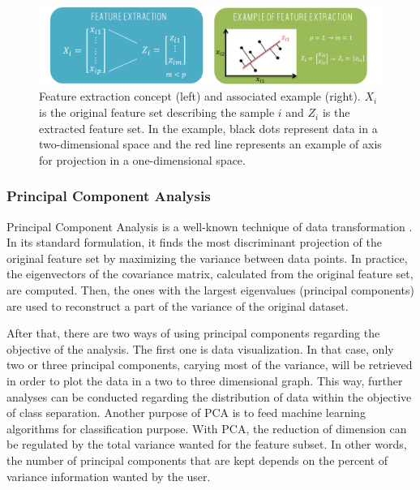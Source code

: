 \documentclass[a4paper,10pt]{article}
\begin{document}
\begin{figure}[htbp]
\centerline{\includegraphics[width=\linewidth]{./figures/featureExtraction.png}}
\caption{Feature extraction concept (left) and associated example (right). $X_i$ is the original feature set describing the sample $i$ and $Z_i$ is the extracted feature set. In the example, black dots represent data in a two-dimensional space and the red line represents an example of axis for projection in a one-dimensional space.}
\label{FeatureExtraction}
\end{figure}

\subsubsection{Principal Component Analysis}

Principal Component Analysis is a well-known technique of data transformation \cite{jolliffe2011principal}. In its standard formulation, it finds the most discriminant projection of the original feature set by maximizing the variance between data points. 
In practice, the eigenvectors of the covariance matrix, calculated from the original feature set, are computed. Then, the ones with the largest eigenvalues (principal components) are used to reconstruct a part of the variance of the original dataset.

After that, there are two ways of using principal components regarding the objective of the analysis. The first one is data visualization. In that case, only two or three principal components, carying most of the variance, will be retrieved in order to plot the data in a two to three dimensional graph. This way, further analyses can be conducted regarding the distribution of data within the objective of class separation. Another purpose of PCA is to feed machine learning algorithms for classification purpose. With PCA, the reduction of dimension can be regulated by the total variance wanted for the feature subset. In other words, the number of principal components that are kept depends on the percent of variance information wanted by the user. 
\end{document}
